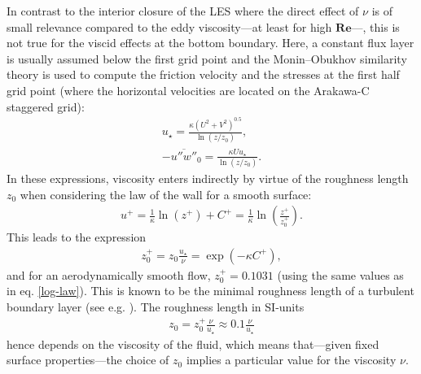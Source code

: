\documentclass[a4paper,11pt]{article}
\newcommand{\RE}{\mathbf{Re}}
\begin{document}
\label{low-bound}

In contrast to the interior closure of the LES where the direct effect of $\nu$ is of small relevance compared to the eddy viscosity---at least for high $\RE$---, this is not true for the viscid effects at the bottom boundary. Here, a constant flux layer is usually assumed below the first grid point and the Monin--Obukhov similarity theory is used to compute the friction velocity and the stresses at the first half grid point (where the horizontal velocities are located on the Arakawa-C staggered grid):
\begin{align}\label{most}
  u_\star = \frac{\kappa(U^2+V^2)^{0.5}}{\ln\left(z/z_0\right)},\\
  -\overline{u''w''}_0 = \frac{\kappa Uu_\star}{\ln\left(z/z_0\right)}.
\end{align}
In these expressions, viscosity enters indirectly by virtue of the roughness length $z_0$ when considering the law of the wall for a smooth surface:
\begin{align}
  u^+ = \frac{1}{\kappa}\ln(z^+) + C^+ = \frac{1}{\kappa}\ln\left(\frac{z^+}{z_0^+}\right).
\end{align}
This leads to the expression
\begin{align}
	z_0^+ = z_0\frac{u_\star}{\nu} = \exp\left(-\kappa C^+\right),
\end{align}
and for an aerodynamically smooth flow, $z_0^+ = 0.1031$ (using the same values as in eq. \ref{log-law}). This is known to be the minimal roughness length of a turbulent boundary layer (see e.g. \cite{kraus2008grundlagen}). The roughness length in SI-units 
\begin{align}
	z_0 = z_0^+\frac{\nu}{u_\star}\approx 0.1\frac{\nu}{u_\star}
\end{align}
hence depends on the viscosity of the fluid, which means that---given fixed surface properties---the choice of $z_0$ implies a particular value for the viscosity $\nu$.
\end{document}
